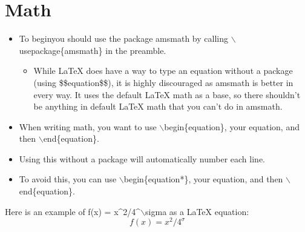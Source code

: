 \section{Math}
	\begin{itemize}
		\item To beginyou should use the  package amsmath by calling $\backslash$usepackage\{amsmath\} in the preamble.
		\begin{itemize}
			\item While \LaTeX{} does have a way to type an equation without a package (using \$\$equation\$\$), it is highly discouraged as amsmath is better in every way. It uses the default \LaTeX{} math as a base, so there shouldn\rq{}t be anything in default \LaTeX{} math that you can\rq{}t do in amsmath.
		\end{itemize}
		\item When writing math, you want to use $\backslash$begin\{equation\}, your equation, and then $\backslash$end\{equation\}.
		\item Using this without a package will automatically number each line.
		\item To avoid this, you can use $\backslash$begin\{equation*\}, your equation, and then $\backslash$end\{equation\}.
	\end{itemize}
	
	Here is an example of f(x) = x\string^2/4\string^$\backslash$sigma as a \LaTeX{} equation:
	\\
	\begin{equation}
		f(x) = x^2/4^\sigma
	\end{equation}

